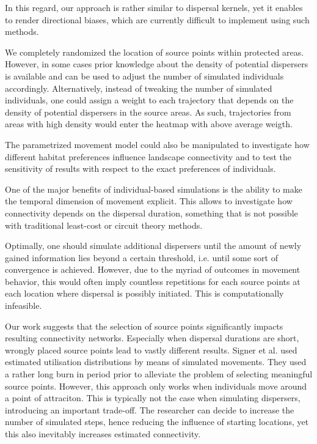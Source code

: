 \documentclass[abstract=on,10pt,a4paper,bibliography=totocnumbered]{article}
\begin{document}
In this regard, our approach is rather similar to dispersal kernels, yet it
enables to render directional biases, which are currently difficult to implement
using such methods.

We completely randomized the location of source points within protected areas.
However, in some cases prior knowledge about the density of potential dispersers
is available and can be used to adjust the number of simulated individuals
accordingly. Alternatively, instead of tweaking the number of simulated
individuals, one could assign a weight to each trajectory that depends on the
density of potential dispersers in the source areas. As such, trajectories from
areas with high density would enter the heatmap with above average weigth.

The parametrized movement model could also be manipulated to investigate how
different habitat preferences influence landscape connectivity and to test the
sensitivity of results with respect to the exact preferences of individuals.

One of the major benefits of individual-based simulations is the ability to make
the temporal dimension of movement explicit. This allows to investigate how
connectivity depends on the dispersal duration, something that is not possible
with traditional least-cost or circuit theory methods.

Optimally, one should simulate additional dispersers until the amount of newly
gained information lies beyond a certain threshold, i.e. until some sort of
convergence is achieved. However, due to the myriad of outcomes in movement
behavior, this would often imply countless repetitions for each source points at
each location where dispersal is possibly initiated. This is computationally
infeasible.

Our work suggests that the selection of source points significantly impacts
resulting connectivity networks. Especially when dispersal durations are short,
wrongly placed source points lead to vastly different results. Signer et al.
used estimated utilisation distributions by means of simulated movements. They
used a rather long burn in period prior to alleviate the problem of selecting
meaningful source points. However, this approach only works when individuals
move around a point of attraciton. This is typically not the case when
simulating dispersers, introducing an important trade-off. The researcher can
decide to increase the number of simulated steps, hence reducing the influence
of starting locations, yet this also inevitably increases estimated
connectivity.
\end{document}
